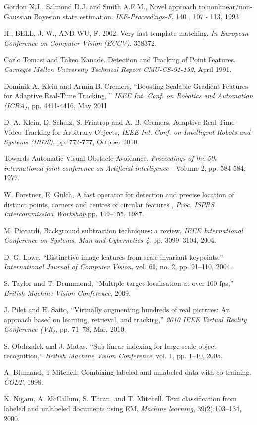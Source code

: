 \begin{thebibliography}{SMAT}
 Gordon N.J., Salmond D.J. and Smith A.F.M., Novel approach to nonlinear/non-Gaussian Bayesian state estimation. \textit{IEE-Proceedings-F}, 140 , 107 - 113, 1993

 H., BELL, J. W., AND WU, F. 2002. Very fast template matching. \textit{In European Conference on Computer Vision (ECCV)}. 358\textendash{}372.

Carlo Tomasi and Takeo Kanade. Detection and Tracking of Point Features. \textit{Carnegie Mellon University Technical Report CMU-CS-91-132}, April 1991.

 Dominik A. Klein and Armin B. Cremers, \textquotedblleft{}Boosting Scalable Gradient Features for Adaptive Real-Time Tracking, \textquotedblright{} \textit{IEEE Int. Conf. on Robotics and Automation (ICRA)}, pp. 4411-4416, May 2011

 D. A. Klein, D. Schulz, S. Frintrop and A. B. Cremers, Adaptive Real-Time Video-Tracking for Arbitrary Objects, \textit{IEEE Int. Conf. on Intelligent Robots and Systems (IROS)}, pp. 772-777, October 2010

 Towards Automatic Visual Obstacle Avoidance. \textit{Proceedings of the 5th international joint conference on Artificial intelligence} - Volume 2, pp. 584-584, 1977.

 W. Förstner, E. Gülch, A fast operator for detection and precise location of distinct points, corners and centres of circular features , \textit{Proc. ISPRS Intercommission Workshop},pp. 149–155, 1987.

 M. Piccardi, Background subtraction techniques: a review, \textit{IEEE International Conference on Systems, Man and Cybernetics 4}. pp. 3099–3104, 2004.

 D. G. Lowe, “Distinctive image features from scale-invariant keypoints,” \textit{International Journal of Computer Vision}, vol. 60, no. 2, pp. 91–110, 2004.

 S. Taylor and T. Drummond, “Multiple target localisation at over 100 fps,” \textit{British Machine Vision Conference}, 2009.

 J. Pilet and H. Saito, “Virtually augmenting hundreds of real pictures: An approach based on learning, retrieval, and tracking,” \textit{2010 IEEE Virtual Reality Conference (VR)}, pp. 71–78, Mar. 2010.

 S. Obdrzalek and J. Matas, “Sub-linear indexing for large scale object recognition,” \textit{British Machine Vision Conference}, vol. 1, pp. 1–10, 2005.

 A. Blumand, T.Mitchell. Combining labeled and unlabeled data with co-training. \textit{COLT}, 1998.

 K. Nigam, A. McCallum, S. Thrun, and T. Mitchell. Text classification from labeled and unlabeled documents using EM. \textit{Machine learning}, 39(2):103–134, 2000.

\end{thebibliography}